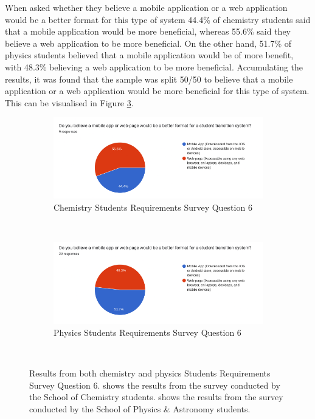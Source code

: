 \documentclass{l4proj}
\begin{document}
When asked whether they believe a mobile application or a web application would be a better format for this type of system 44.4\% of chemistry students said that a mobile application would be more beneficial,  whereas 55.6\% said they believe a web application to be more beneficial. On the other hand,  51.7\% of physics students believed that a mobile application would be of more benefit,  with 48.3\% believing a web application to be more beneficial. Accumulating the results,  it was found that the sample was split 50/50 to believe that a mobile application or a web application would be more beneficial for this type of system. This can be visualised in Figure \ref{fig:format}.

\begin{figure}[h]
    \centering
    \begin{subfigure}[b]{0.7\textwidth}
        \includegraphics[width=\textwidth]{images/chemistry_format_results.pdf}
        \caption{Chemistry Students Requirements Survey Question 6}
        \label{fig:syn1}
    \end{subfigure}
    ~ %
    \begin{subfigure}[b]{0.7\textwidth}
        \includegraphics[width=\textwidth]{images/physics_format_results.pdf}
        \caption{Physics Students Requirements Survey Question 6}
        \label{fig:syn2}
    \end{subfigure}
    ~ %
    \caption{Results from both chemistry and physics Students Requirements Survey Question 6.  shows the results from the survey conducted by the School of Chemistry students.  shows the results from the survey conducted by the School of Physics \& Astronomy students.
    }\label{fig:format}
\end{figure}
\end{document}
